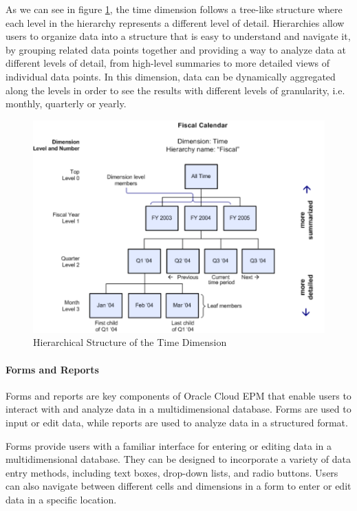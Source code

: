 \documentclass[12pt,a4paper,openright,twoside]{book}
\begin{document}
As we can see in figure \ref{fig:hierarchy}, the time dimension follows a tree-like structure where each level in the hierarchy represents a different level of detail. 
%
Hierarchies allow users to organize data into a structure that is easy to understand and navigate it, by grouping related data points together and providing a way to analyze data at different levels of detail, from high-level summaries to more detailed views of individual data points.
%
In this dimension, data can be dynamically aggregated along the levels in order to see the results with different levels of granularity, i.e. monthly, quarterly or yearly.

\begin{figure}[htbp]
	\centering
	\includegraphics[width=\linewidth]{figures/hierarchy.pdf}
	\caption{Hierarchical Structure of the Time Dimension}
	\label{fig:hierarchy}
\end{figure}

\paragraph{Forms and Reports}

Forms and reports are key components of Oracle Cloud EPM that enable users to interact with and analyze data in a multidimensional database. 
%
Forms are used to input or edit data, while reports are used to analyze data in a structured format.

Forms provide users with a familiar interface for entering or editing data in a multidimensional database. 
%
They can be designed to incorporate a variety of data entry methods, including text boxes, drop-down lists, and radio buttons. 
%
Users can also navigate between different cells and dimensions in a form to enter or edit data in a specific location.
\end{document}
